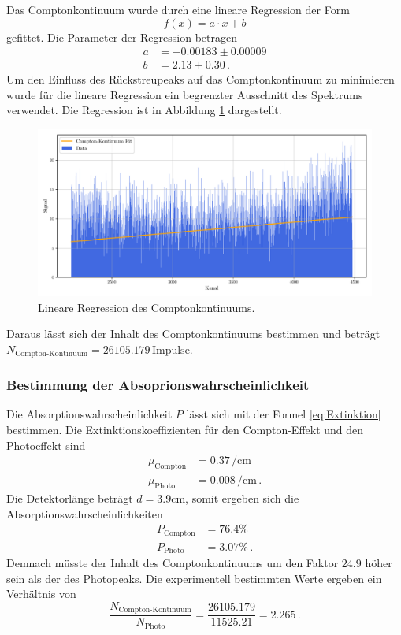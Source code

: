 Das Comptonkontinuum wurde durch eine lineare Regression der Form
\begin{equation}
  f(x) = a \cdot x + b
\end{equation}
gefittet.
Die Parameter der Regression betragen
\begin{align*}
  a &= -0.00183 \pm 0.00009 \\
  b &= 2.13 \pm 0.30 \, .
\end{align*}
Um den Einfluss des Rückstreupeaks auf das Comptonkontinuum zu minimieren wurde für die lineare Regression ein begrenzter Ausschnitt des Spektrums verwendet.
Die Regression ist in Abbildung \ref{fig:compton-Kontinuum} dargestellt.
\begin{figure}[H]
  \centering
  \includegraphics[width=\textwidth]{../plots/Caesium-Compton-Kontinuum.pdf}
  \caption{Lineare Regression des Comptonkontinuums.}
  \label{fig:compton-Kontinuum}
\end{figure}
Daraus lässt sich der Inhalt des Comptonkontinuums bestimmen und beträgt $N_\text{Compton-Kontinuum} = 26105.179 \, \text{Impulse}$.

\subsubsection{Bestimmung der Absoprionswahrscheinlichkeit}
Die Absorptionswahrscheinlichkeit $P$ lässt sich mit der Formel \ref{eq:Extinktion} bestimmen.
Die Extinktionskoeffizienten für den Compton-Effekt und den Photoeffekt sind 
\begin{align*}
  \mu_\text{Compton} &= 0.37 \, \si{\per\centi\meter} \\
  \mu_\text{Photo} &= 0.008 \, \si{\per\centi\meter} \, .
\end{align*}
Die Detektorlänge beträgt $d=3.9 \si{\centi\metre}$, somit ergeben sich die Absorptionswahrscheinlichkeiten
\begin{align*}
  P_\text{Compton} &= 76.4 \si{\percent} \\
  P_\text{Photo} &= 3.07 \si{\percent} \, .
\end{align*}
Demnach müsste der Inhalt des Comptonkontinuums um den Faktor $24.9$ höher sein als der des Photopeaks.
Die experimentell bestimmten Werte ergeben ein Verhältnis von
\begin{equation*}
  \frac{N_\text{Compton-Kontinuum}}{N_\text{Photo}} = \frac{26105.179}{11525.21}= 2.265 \, .
\end{equation*}

